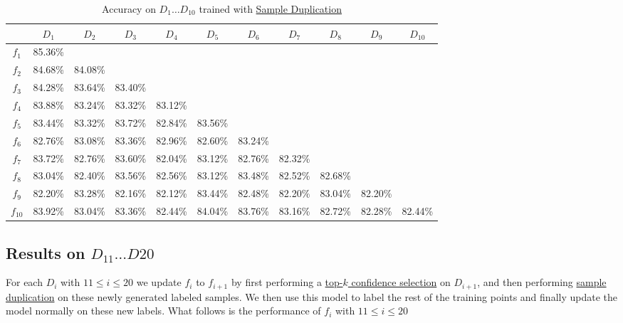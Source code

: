 \documentclass{article} %
\begin{document}
\begin{table}[H]
    \hspace{-1.0cm}
    \begin{tabular}{|c|c|c|c|c|c|c|c|c|c|c|}
        \hline
        & $D_1$ & $D_2$ & $D_3$ & $D_4$ & $D_5$ & $D_6$ & $D_7$ & $D_8$ & $D_9$ & $D_{10}$ \\
        \hline
        $f_1$      & 85.36\% & & & & & & & & & \\
        $f_2$      & 84.68\% & 84.08\% & & & & & & & & \\
        $f_3$      & 84.28\% & 83.64\% & 83.40\% & & & & & & & \\
        $f_4$      & 83.88\% & 83.24\% & 83.32\% & 83.12\% & & & & & & \\
        $f_5$      & 83.44\% & 83.32\% & 83.72\% & 82.84\% & 83.56\% & & & & & \\
        $f_6$      & 82.76\% & 83.08\% & 83.36\% & 82.96\% & 82.60\% & 83.24\%  & & & & \\
        $f_7$      & 83.72\% & 82.76\% & 83.60\% & 82.04\% & 83.12\% & 82.76\% & 82.32\% & & & \\
        $f_8$      & 83.04\% & 82.40\% & 83.56\% & 82.56\% & 83.12\% & 83.48\% & 82.52\% & 82.68\% & & \\
        $f_9$      & 82.20\% & 83.28\% & 82.16\% & 82.12\% & 83.44\% & 82.48\% & 82.20\% & 83.04\% & 82.20\% & \\
        $f_{10}$ & 83.92\% & 83.04\% & 83.36\% & 82.44\% & 84.04\% & 83.76\% & 83.16\% & 82.72\% & 82.28\% & 82.44\%\\
        \hline
    \end{tabular}
    \caption{Accuracy on $D_1 \dots D_{10}$ trained with \hyperref[sd]{Sample Duplication}}
\end{table}

\subsection{Results on $D_{11} \dots D{20}$}
For each $D_i$ with $11 \leq i \leq 20$ we update $f_i$ to $f_{i + 1}$ by first performing a \hyperref[tkcs]{top-$k$ confidence selection} on $D_{i + 1}$, and then performing \hyperref[sd]{sample duplication} on these newly generated labeled samples. We then use this model to label the rest of the training points and finally update the model normally on these new labels. What follows is the performance of $f_i$ with $11 \leq i \leq 20$
\end{document}
